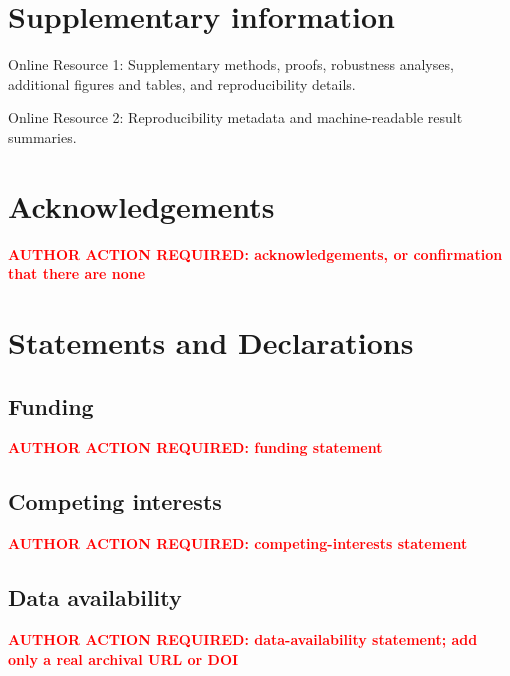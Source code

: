 \documentclass[pdflatex,sn-mathphys-num]{sn-jnl}
\theoremstyle{thmstyleone}
\theoremstyle{thmstylethree}
\theoremstyle{thmstyletwo}
\newcommand{\authoraction}[1]{\textcolor{red}{\textbf{AUTHOR ACTION REQUIRED: #1}}}
\begin{document}
\maketitle










\backmatter

\section*{Supplementary information}

Online Resource 1: Supplementary methods, proofs, robustness analyses,
additional figures and tables, and reproducibility details.

Online Resource 2: Reproducibility metadata and machine-readable result
summaries.

\section*{Acknowledgements}

\authoraction{acknowledgements, or confirmation that there are none}

\section*{Statements and Declarations}

\subsection*{Funding}

\authoraction{funding statement}

\subsection*{Competing interests}

\authoraction{competing-interests statement}

\subsection*{Data availability}

\authoraction{data-availability statement; add only a real archival URL or DOI}
\end{document}
